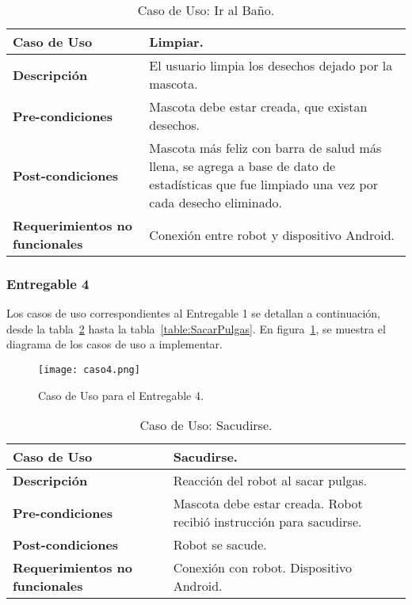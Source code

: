 \begin{table}[htbp!]
  \centering
  \begin{tabular}{|p{4cm}|p{6cm}|}\hline
    \bf{Caso de Uso}                   & Limpiar. \\ \hline
    \bf{Descripci\'on}                 & El usuario limpia los desechos dejado por la mascota. \\ \hline
    \bf{Pre-condiciones}               & Mascota debe estar creada, que existan desechos. \\ \hline
    \bf{Post-condiciones}              & Mascota m\'as feliz con barra de salud m\'as llena, se agrega a base de dato de estad\'isticas que fue limpiado una vez por cada desecho eliminado. \\ \hline
    \bf{Requerimientos no funcionales} & Conexi\'on entre robot y dispositivo Android. \\ \hline
  \end{tabular}
  \caption[~~Caso de Uso: Ir al Ba\~no]{Caso de Uso: Ir al Ba\~no.}
  \label{table:IrBanio}
\end{table}

%
%
\newpage
\subsubsection{Entregable 4}

Los casos de uso correspondientes al Entregable 1 se detallan a continuaci\'on, desde la tabla~\ref{table:Sacudirse} hasta la tabla~\ref{table:SacarPulgas}. En figura~\ref{fig:Caso4}, se muestra el diagrama de los casos de uso a implementar.

\begin{figure}[H]
  \centering
  \texttt{[image: caso4.png]}
  \caption[~Caso de Uso Entregable 4]{Caso de Uso para el Entregable 4.}
  \label{fig:Caso4}
\end{figure}

\begin{table}[htbp!]
  \centering
  \begin{tabular}{|p{4cm}|p{6cm}|}\hline
    \bf{Caso de Uso}                   & Sacudirse. \\ \hline
    \bf{Descripci\'on}                 & Reacci\'on del robot al sacar pulgas. \\ \hline
    \bf{Pre-condiciones}               & Mascota debe estar creada. Robot recibi\'o instrucci\'on para sacudirse. \\ \hline
    \bf{Post-condiciones}              & Robot se sacude. \\ \hline
    \bf{Requerimientos no funcionales} & Conexi\'on con robot. Dispositivo Android. \\ \hline
  \end{tabular}
  \caption[~~Caso de Uso: Sacudirse]{Caso de Uso: Sacudirse.}
  \label{table:Sacudirse}
\end{table}

